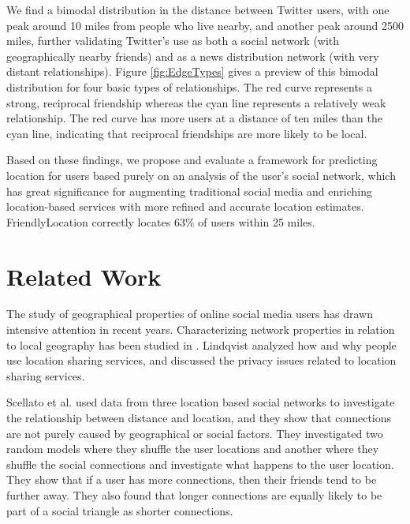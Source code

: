 We find a bimodal distribution in the distance between Twitter users, with one peak around 10 miles from
people who live nearby, and another peak around 2500 miles, further validating
Twitter's use as both a social network (with geographically nearby friends) and
as a news distribution network (with very distant relationships).
Figure \ref{fig:EdgeTypes} gives a preview of this bimodal distribution for four basic types of relationships.
The red curve represents a strong, reciprocal friendship whereas the cyan line
represents a relatively weak relationship. The red curve has more users at a
distance of ten miles than the cyan line, indicating that reciprocal
friendships are more likely to be local.

Based on these findings, we propose and evaluate a framework for predicting location for
users based purely on an analysis of the user's social network, which has great
significance for augmenting traditional social media and enriching
location-based services with more refined and accurate location estimates.
FriendlyLocation correctly locates 63\% of users within 25 miles.

\section{Related Work}

The study of geographical properties of online social media users has drawn intensive attention in
recent years.
Characterizing network properties
in relation to local geography has been studied in \cite{yardi2010tweeting}.
Lindqvist \cite{lindqvist2011m} analyzed how and why people use location sharing services, and discussed
the privacy issues related to location sharing services.

Scellato et al. \cite{scellato2011socio} used data from three location based
social networks to investigate the relationship between distance and location,
and they show that connections are not purely caused by geographical or social
factors.
They investigated two random models where they shuffle the user locations and
another where they shuffle the social connections and investigate what happens
to the user location.
They show that if a user has more connections, then their friends tend to be further away.
They also found that longer connections are equally likely to be part of a
social triangle as shorter connections.

